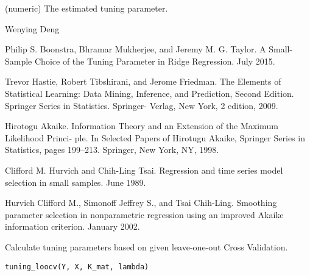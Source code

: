 \documentclass[a4paper]{book}
\begin{document}
%
\begin{Details}\relax
{}

\end{Details}
%
\begin{Value}
\begin{ldescription}
\item[\code{lambda0}] (numeric) The estimated tuning parameter.
\end{ldescription}
\end{Value}
%
\begin{Author}\relax
Wenying Deng
\end{Author}
%
\begin{References}\relax
Philip S. Boonstra, Bhramar Mukherjee, and Jeremy M. G. Taylor.
A Small-Sample Choice of the Tuning Parameter in Ridge Regression. July
2015.

Trevor Hastie, Robert Tibshirani, and Jerome Friedman. The Elements of
Statistical Learning: Data Mining, Inference, and Prediction, Second
Edition. Springer Series in Statistics. Springer- Verlag, New York, 2
edition, 2009.

Hirotogu Akaike. Information Theory and an Extension of the Maximum
Likelihood Princi- ple. In Selected Papers of Hirotugu Akaike, Springer
Series in Statistics, pages 199–213. Springer, New York, NY, 1998.

Clifford M. Hurvich and Chih-Ling Tsai. Regression and time series model
selection in small samples. June 1989.

Hurvich Clifford M., Simonoff Jeffrey S., and Tsai Chih-Ling. Smoothing
parameter selection in nonparametric regression using an improved Akaike
information criterion. January 2002.
\end{References}
%
\begin{Description}\relax
Calculate tuning parameters based on given leave-one-out Cross Validation.
\end{Description}
%
\begin{Usage}
\begin{verbatim}
tuning_loocv(Y, X, K_mat, lambda)
\end{verbatim}
\end{Usage}
%
\end{document}
